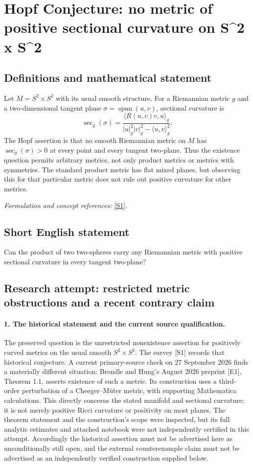 \documentclass[11pt]{article}
\begin{document}
\section*{\texorpdfstring{Hopf Conjecture: no metric of positive sectional curvature on S\textasciicircum{}2 x S\textasciicircum{}2}{Hopf Conjecture: no metric of positive sectional curvature on S\textasciicircum{}2 x S\textasciicircum{}2}}\label{30006874}
\subsection{Definitions and mathematical statement}
Let $M=S^2\times S^2$ with its usual smooth structure. For a Riemannian metric $g$ and a two-dimensional tangent plane $\sigma=\operatorname{span}(u,v)$, sectional curvature is
\[
 \sec_g(\sigma)=\frac{\langle R(u,v)v,u\rangle_g}
 {|u|_g^2|v|_g^2-\langle u,v\rangle_g^2}.
\]
The Hopf assertion is that no smooth Riemannian metric on $M$ has $\sec_g(\sigma)>0$ at every point and every tangent two-plane. Thus the existence question permits arbitrary metrics, not only product metrics or metrics with symmetries. The standard product metric has flat mixed planes, but observing this for that particular metric does not rule out positive curvature for other metrics.
\par\smallskip\textit{Formulation and concept references:} \href{https://arxiv.org/html/math/0701389v3}{[S1]}.

\subsection{Short English statement}
Can the product of two two-spheres carry any Riemannian metric with positive sectional curvature in every tangent two-plane?
\subsection{Research attempt: restricted metric obstructions and a recent contrary claim}
\paragraph{1. The historical statement and the current source qualification.}
The preserved question is the unrestricted nonexistence assertion for positively curved metrics on the usual smooth $S^2\times S^2$. The survey [S1] records that historical conjecture. A current primary-source check on 27 September 2026 finds a materially different situation: Brendle and Hung's August 2026 preprint [E1], Theorem 1.1, asserts existence of such a metric. Its construction uses a third-order perturbation of a Cheeger--M\"uter metric, with supporting Mathematica calculations. This directly concerns the stated manifold and sectional curvature; it is not merely positive Ricci curvature or positivity on most planes. The theorem statement and the construction's scope were inspected, but its full analytic estimates and attached notebook were not independently certified in this attempt. Accordingly the historical assertion must not be advertised here as unconditionally still open, and the external counterexample claim must not be advertised as an independently verified construction supplied below.
\end{document}
